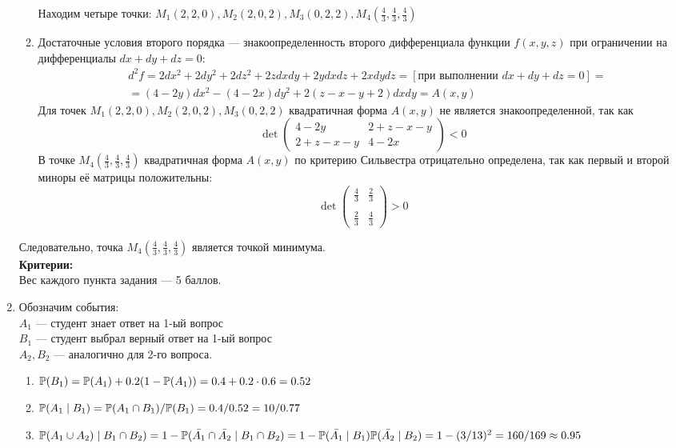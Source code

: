 \documentclass[pdftex,12pt,a4paper]{article}
\begin{document}
\begin{enumerate}
\begin{enumerate}
Находим четыре точки: $M_1(2,2,0), M_2(2,0,2), M_3(0,2,2),M_4(\frac{4}{3},\frac{4}{3},\frac{4}{3})$\\
\item Достаточные условия второго порядка --- знакоопределенность второго дифференциала функции $f(x,y,z)$ при ограничении на дифференциалы $dx+dy+dz=0$:
\begin{eqnarray}
&d^2 f=2dx^2+2d y^2+2d z^2+2zdxdy+2ydxdz+2xdydz=[\textit{при выполнении }  dx+dy+dz=0]=\\
&=(4-2y)dx^2-(4-2x)dy^2+2(z-x-y+2)dxdy=A(x,y)
\end{eqnarray}
Для точек $M_1(2,2,0), M_2(2,0,2), M_3(0,2,2)$ квадратичная форма $A(x,y)$ не является знакоопределенной, так как
\begin{equation}
\det \left(\begin{array}{cc}
4-2y & 2+z-x-y\\
2+z-x-y & 4-2x
\end{array}\right) <0
\end{equation}
В точке $M_4(\frac{4}{3},\frac{4}{3},\frac{4}{3})$ квадратичная форма $A(x,y)$ по критерию Сильвестра отрицательно определена, так как первый и второй миноры её матрицы положительны:
\begin{equation}
\det \left(\begin{array}{cc}
\frac{4}{3} & \frac{2}{3}\\\\
\frac{2}{3} & \frac{4}{3}
\end{array}\right)>0
\end{equation}
\end{enumerate}
Следовательно, точка $M_4(\frac{4}{3},\frac{4}{3},\frac{4}{3})$ является точкой минимума.\\
\textbf{Критерии:}\\
Вес каждого пункта задания --- 5 баллов.
\item Обозначим события:\\
$A_1$ --- студент знает ответ на 1-ый вопрос\\
$B_1$ --- студент выбрал верный ответ на 1-ый вопрос\\
$A_2, B_2$ --- аналогично для 2-го вопроса.\\
\begin{enumerate}
\item $\P(B_1)=\P(A_1)+0.2(1-\P(A_1))=0.4+0.2\cdot 0.6=0.52$
\item $\P(A_1\mid B_1)=\P(A_1\cap B_1)/\P(B_1)=0.4/0.52=10/ 0.77$
\item $\P(A_1\cup A_2)\mid B_1\cap B_2)=1-\P(\bar{A_1}\cap \bar{A_2}\mid B_1\cap B_2)=1-\P(\bar{A_1}\mid B_1)\P(\bar{A_2}\mid B_2)=1-(3/13)^2=160/169\approx 0.95$

\end{enumerate}
\end{enumerate}
\end{document}
